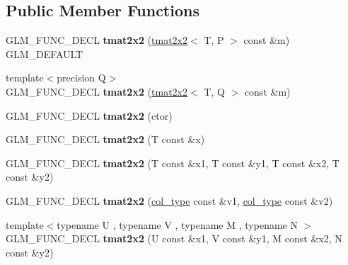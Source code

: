 \subsection*{Public Member Functions}
\begin{DoxyCompactItemize}
\item 
\hypertarget{structglm_1_1tmat2x2_a35326be3558b276f538fe1968eb22df5}{G\-L\-M\-\_\-\-F\-U\-N\-C\-\_\-\-D\-E\-C\-L {\bfseries tmat2x2} (\hyperlink{structglm_1_1tmat2x2}{tmat2x2}$<$ T, P $>$ const \&m) G\-L\-M\-\_\-\-D\-E\-F\-A\-U\-L\-T}\label{structglm_1_1tmat2x2_a35326be3558b276f538fe1968eb22df5}

\item 
\hypertarget{structglm_1_1tmat2x2_a2f3cdab306325bbc4b1e1c57eb3a203a}{{\footnotesize template$<$precision Q$>$ }\\G\-L\-M\-\_\-\-F\-U\-N\-C\-\_\-\-D\-E\-C\-L {\bfseries tmat2x2} (\hyperlink{structglm_1_1tmat2x2}{tmat2x2}$<$ T, Q $>$ const \&m)}\label{structglm_1_1tmat2x2_a2f3cdab306325bbc4b1e1c57eb3a203a}

\item 
\hypertarget{structglm_1_1tmat2x2_a06e48241a885bb1e28ec6491d56882c8}{G\-L\-M\-\_\-\-F\-U\-N\-C\-\_\-\-D\-E\-C\-L {\bfseries tmat2x2} (ctor)}\label{structglm_1_1tmat2x2_a06e48241a885bb1e28ec6491d56882c8}

\item 
\hypertarget{structglm_1_1tmat2x2_a775b2f9953d340e6064f9d4bbb74b19d}{G\-L\-M\-\_\-\-F\-U\-N\-C\-\_\-\-D\-E\-C\-L {\bfseries tmat2x2} (T const \&x)}\label{structglm_1_1tmat2x2_a775b2f9953d340e6064f9d4bbb74b19d}

\item 
\hypertarget{structglm_1_1tmat2x2_ab7ee77d8b2dcae2fdcd50192ff34ab90}{G\-L\-M\-\_\-\-F\-U\-N\-C\-\_\-\-D\-E\-C\-L {\bfseries tmat2x2} (T const \&x1, T const \&y1, T const \&x2, T const \&y2)}\label{structglm_1_1tmat2x2_ab7ee77d8b2dcae2fdcd50192ff34ab90}

\item 
\hypertarget{structglm_1_1tmat2x2_a6b69a58d1a8d7856f47240557f0c8615}{G\-L\-M\-\_\-\-F\-U\-N\-C\-\_\-\-D\-E\-C\-L {\bfseries tmat2x2} (\hyperlink{structglm_1_1tvec2}{col\-\_\-type} const \&v1, \hyperlink{structglm_1_1tvec2}{col\-\_\-type} const \&v2)}\label{structglm_1_1tmat2x2_a6b69a58d1a8d7856f47240557f0c8615}

\item 
\hypertarget{structglm_1_1tmat2x2_aac710faffcebf55cc2120a98b4ab0373}{{\footnotesize template$<$typename U , typename V , typename M , typename N $>$ }\\G\-L\-M\-\_\-\-F\-U\-N\-C\-\_\-\-D\-E\-C\-L {\bfseries tmat2x2} (U const \&x1, V const \&y1, M const \&x2, N const \&y2)}\label{structglm_1_1tmat2x2_aac710faffcebf55cc2120a98b4ab0373}


\end{DoxyCompactItemize}
